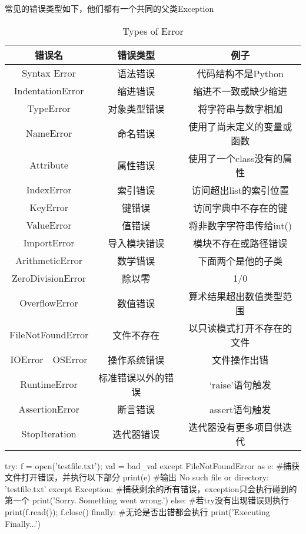     常见的错误类型如下，他们都有一个共同的父类Exception
    \begin{table}
      \centering  
      \caption{Types of Error}
      \label{tab: types of error}
      \begin{tabular}{ccc}
        \toprule[1.5pt]
        错误名 & 错误类型 & 例子 \\
        \midrule
        Syntax Error & 语法错误 & 代码结构不是Python \\
        IndentationError & 缩进错误 & 缩进不一致或缺少缩进 \\
        TypeError & 对象类型错误 & 将字符串与数字相加 \\
        NameError & 命名错误 & 使用了尚未定义的变量或函数 \\
        Attribute & 属性错误 & 使用了一个class没有的属性 \\
        IndexError & 索引错误 & 访问超出list的索引位置 \\
        KeyError & 键错误 & 访问字典中不存在的键 \\
        ValueError & 值错误 & 将非数字字符串传给int() \\
        ImportError & 导入模块错误 & 模块不存在或路径错误 \\
        ArithmeticError & 数学错误 & 下面两个是他的子类 \\
        ZeroDivisionError & 除以零 & 1/0 \\
        OverflowError & 数值错误 & 算术结果超出数值类型范围 \\
        FileNotFoundError & 文件不存在 & 以只读模式打开不存在的文件 \\
        IOError~~OSError & 操作系统错误 & 文件操作出错 \\
        RuntimeError & 标准错误以外的错误 & `raise'语句触发 \\
        AssertionError & 断言错误 & assert语句触发 \\
        StopIteration & 迭代器错误 & 迭代器没有更多项目供迭代 \\
        \bottomrule[1.5pt]
      \end{tabular}
    \end{table}

    \begin{codeblock}[language=python, caption={try except}]
      try:
          f = open('testfile.txt'); val = bad_val
      except FileNotFoundError as e: #捕获文件打开错误，并执行以下部分
          print(e) #输出 No such file or directory: 'testfile.txt'
      except Exception: #捕获剩余的所有错误，exception只会执行碰到的第一个
          print('Sorry. Something went wrong.')
      else: #若try没有出现错误则执行
          print(f.read()); f.close()
      finally: #无论是否出错都会执行
          print('Executing Finally...')
    \end{codeblock}

